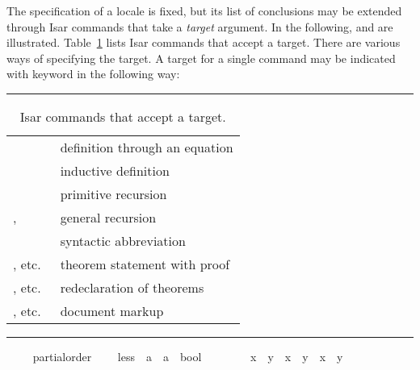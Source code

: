 \begin{isabellebody}
\begin{isamarkuptext}
  The specification of a locale is fixed, but its list of conclusions
  may be extended through Isar commands that take a \emph{target} argument.
  In the following,  and 
   are illustrated.
  Table~\ref{tab:commands-with-target} lists Isar commands that accept
  a target.  There are various ways of specifying the target.  A
  target for a single command may be indicated with keyword
   in the following way:

\begin{table}
\hrule
\vspace{2ex}
\begin{center}
\begin{tabular}{ll}
  \isakeyword{definition} & definition through an equation \\
  \isakeyword{inductive} & inductive definition \\
  \isakeyword{primrec} & primitive recursion \\
  \isakeyword{fun}, \isakeyword{function} & general recursion \\
  \isakeyword{abbreviation} & syntactic abbreviation \\
  \isakeyword{theorem}, etc.\ & theorem statement with proof \\
  \isakeyword{theorems}, etc.\ & redeclaration of theorems \\
  \isakeyword{text}, etc.\ & document markup
\end{tabular}
\end{center}
\hrule
\caption{Isar commands that accept a target.}
\label{tab:commands-with-target}
\end{table}%
\end{isamarkuptext}%
\isamarkuptrue%
\ \ \isamarkupfalse%
\ {\isacharparenleft}\ partial{\isacharunderscore}order{\isacharparenright}\isanewline
\ \ \ \ less\ {\isacharcolon}{\isacharcolon}\ {\isachardoublequoteopen}{\isacharprime}a\ {\isasymRightarrow}\ {\isacharprime}a\ {\isasymRightarrow}\ bool{\isachardoublequoteclose}\ {\isacharparenleft}\ {\isachardoublequoteopen}{\isasymsqsubset}{\isachardoublequoteclose}\ {}{}{\isacharparenright}\isanewline
\ \ \ \ \ {\isachardoublequoteopen}{\isacharparenleft}x\ {\isasymsqsubset}\ y{\isacharparenright}\ {\isacharequal}\ {\isacharparenleft}x\ {\isasymsqsubseteq}\ y\ {\isasymand}\ x\ {\isasymnoteq}\ y{\isacharparenright}{\isachardoublequoteclose}%
\begin{isamarkuptext}%

\end{isamarkuptext}
\end{isabellebody}
